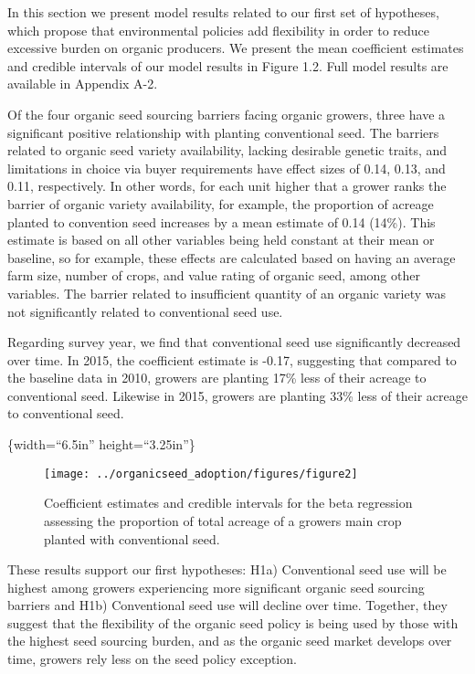 \documentclass[twoside,12pt,final]{ucthesis-CA2012}
\begin{document}
\begin{ucmainmatter}
In this section we present model results related to our first set of
hypotheses, which propose that environmental policies add flexibility in
order to reduce excessive burden on organic producers. We present the
mean coefficient estimates and credible intervals of our model results
in Figure 1.2. Full model results are available in Appendix A-2.

Of the four organic seed sourcing barriers facing organic growers, three
have a significant positive relationship with planting conventional
seed. The barriers related to organic seed variety availability, lacking
desirable genetic traits, and limitations in choice via buyer
requirements have effect sizes of 0.14, 0.13, and 0.11, respectively. In
other words, for each unit higher that a grower ranks the barrier of
organic variety availability, for example, the proportion of acreage
planted to convention seed increases by a mean estimate of 0.14 (14\%).
This estimate is based on all other variables being held constant at
their mean or baseline, so for example, these effects are calculated
based on having an average farm size, number of crops, and value rating
of organic seed, among other variables. The barrier related to
insufficient quantity of an organic variety was not significantly
related to conventional seed use.

Regarding survey year, we find that conventional seed use significantly
decreased over time. In 2015, the coefficient estimate is -0.17,
suggesting that compared to the baseline data in 2010, growers are
planting 17\% less of their acreage to conventional seed. Likewise in
2015, growers are planting 33\% less of their acreage to conventional
seed.

\{width=``6.5in'' height=``3.25in''\}
\begin{figure}

{\centering \texttt{[image: ../organicseed\_adoption/figures/figure2]} 

}

\caption{Coefficient estimates and credible intervals for the beta regression assessing the proportion of total acreage of a growers main crop planted with conventional seed.}\label{fig:unnamed-chunk-11}
\end{figure}
These results support our first hypotheses: H1a) Conventional seed use
will be highest among growers experiencing more significant organic seed
sourcing barriers and H1b) Conventional seed use will decline over time.
Together, they suggest that the flexibility of the organic seed policy
is being used by those with the highest seed sourcing burden, and as the
organic seed market develops over time, growers rely less on the seed
policy exception.


\end{ucmainmatter}
\end{document}
